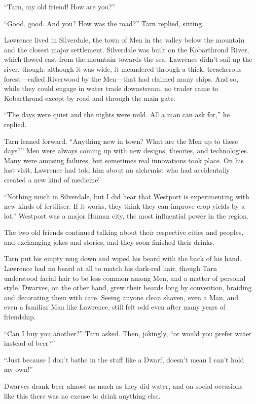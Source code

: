 ``Tarn, my old friend!  How are you?''

``Good, good.  And you?  How was the road?'' Tarn replied, sitting.

Lawrence lived in Silverdale, the town of Men in the valley below the mountain and the closest major settlement.  Silverdale was built on the Kobarthrond River, which flowed east from the mountain towards the sea.  Lawrence didn't sail up the river, though: although it was wide, it meandered through a thick, treacherous forest---called Riverwood by the Men---that had claimed many ships.  And so, while they could engage in water trade downstream, no trader came to Kobarthrond except by road and through the main gate.

``The days were quiet and the nights were mild.  All a man can ask for,'' he replied.


Tarn leaned forward.  ``Anything new in town?  What are the Men up to these days?''  Men were always coming up with new designs, theories, and technologies.  Many were amusing failures, but sometimes real innovations took place.  On his last visit, Lawrence had told him about an alchemist who had accidentally created a new kind of medicine!

``Nothing much in Silverdale, but I did hear that Westport is experimenting with new kinds of fertiliser.  If it works, they think they can improve crop yields by a lot.''  Westport was a major Human city, the most influential power in the region.

The two old friends continued talking about their respective cities and peoples, and exchanging jokes and stories, and they soon finished their drinks.

Tarn put his empty mug down and wiped his beard with the back of his hand.  Lawrence had no beard at all to match his dark-red hair, though Tarn understood facial hair to be less common among Men, and a matter of personal style.  Dwarves, on the other hand, grew their beards long by convention, braiding and decorating them with care.  Seeing anyone clean shaven, even a Man, and even a familiar Man like Lawrence, still felt odd even after many years of friendship.

``Can I buy you another?'' Tarn asked.  Then, jokingly, ``or would you prefer water instead of beer?''

``Just because I don't bathe in the stuff like a Dwarf, doesn't mean I can't hold my own!''

Dwarves drank beer almost as much as they did water, and on social occasions like this there was no excuse to drink anything else.

